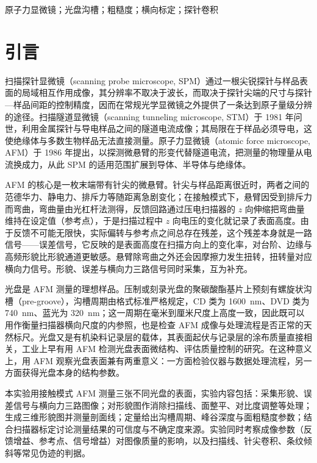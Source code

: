 \documentclass[12pt,a4paper,fontset=windows]{ctexart}
\begin{document}
\vspace{0.5cm}
\songti{}原子力显微镜；光盘沟槽；粗糙度；横向标定；探针卷积

\newpage

\section*{引言}

\songti{}

扫描探针显微镜（scanning probe microscope, SPM）通过一根尖锐探针与样品表面的局域相互作用成像，其分辨率不取决于波长，而取决于探针尖端的尺寸与探针—样品间距的控制精度，因而在常规光学显微镜之外提供了一条达到原子量级分辨的途径。扫描隧道显微镜（scanning tunneling microscope, STM）于 1981 年问世，利用金属探针与导电样品之间的隧道电流成像\cite{binnig1982}；其局限在于样品必须导电，这使绝缘体与多数生物样品无法直接测量。原子力显微镜（atomic force microscope, AFM）于 1986 年提出，以探测微悬臂的形变代替隧道电流，把测量的物理量从电流换成力\cite{binnig1986}，从此 SPM 的适用范围扩展到导体、半导体与绝缘体。

AFM 的核心是一枚末端带有针尖的微悬臂。针尖与样品距离很近时，两者之间的范德华力、静电力、排斥力等随距离急剧变化；在接触模式下，悬臂因受到排斥力而弯曲，弯曲量由光杠杆法测得，反馈回路通过压电扫描器的 $z$ 向伸缩把弯曲量维持在设定值（参考点），于是扫描过程中 $z$ 向电压的变化就记录了表面高度。由于反馈不可能无限快，实际偏转与参考点之间总存在残差，这个残差本身就是一路信号——误差信号，它反映的是表面高度在扫描方向上的变化率，对台阶、边缘与高频形貌比形貌通道更敏感。悬臂除弯曲之外还会因摩擦力发生扭转，扭转量对应横向力信号。形貌、误差与横向力三路信号同时采集，互为补充。

光盘是 AFM 测量的理想样品。压制或刻录光盘的聚碳酸酯基片上预刻有螺旋状沟槽（pre-groove），沟槽周期由格式标准严格规定，CD 类为 1600~nm、DVD 类为 740~nm、蓝光为 320~nm；这一周期在毫米到厘米尺度上高度一致，因此既可以用作衡量扫描器横向尺度的内参照，也是检查 AFM 成像与处理流程是否正常的天然标尺。光盘又是有机染料记录层的载体，其表面起伏与记录层的涂布质量直接相关，工业上早有用 AFM 检测光盘表面微结构、评估质量控制的研究\cite{sun2005,xu2008,jing2003}。在这种意义上，用 AFM 观察光盘表面兼有两重意义：一方面检验仪器与数据处理流程，另一方面获得光盘本身的结构参数。

本实验用接触模式 AFM 测量三张不同光盘的表面，实验内容包括：采集形貌、误差信号与横向力三路图像；对形貌图作消除扫描线、面整平、对比度调整等处理；生成三维形貌图并测量剖面线；定量给出沟槽周期、峰谷深度与面粗糙度参数；结合扫描器标定讨论测量结果的可信度与不确定度来源。实验同时考察成像参数（反馈增益、参考点、信号增益）对图像质量的影响，以及扫描线、针尖卷积、条纹倾斜等常见伪迹的判据。
\end{document}
